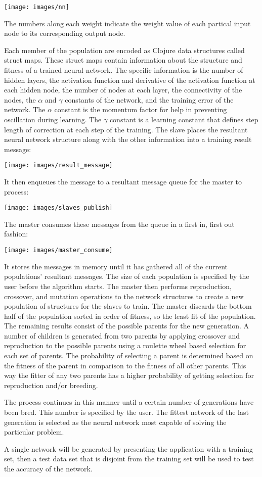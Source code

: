 \texttt{[image: images/nn]}

The numbers along each weight indicate the weight value of each partical input node to its corresponding output node. 

Each member of the population are encoded as Clojure data structures called struct maps. 
These struct maps contain information about the structure and fitness of a trained neural network. 
The specific information is the number of hidden layers, the activation function and derivative of the activation function at each hidden node, the number of nodes at each layer, the connectivity of the nodes, the $\alpha$ and $\gamma$ constants of the network, and the training error of the network. 
The $\alpha$ constant is the momentum factor for help in preventing oscillation during learning. 
The $\gamma$ constant is a learning constant that defines step length of correction at each step of the training.
The slave places the resultant neural network structure along with the other information into a training result message:

\texttt{[image: images/result\_message]}

It then enqueues the message to a resultant message queue for the master to process:

\texttt{[image: images/slaves\_publish]} 

The master consumes these messages from the queue in a first in, first out fashion:

\texttt{[image: images/master\_consume]} 

It stores the messages in memory until it has gathered all of the current populations' resultant messages. 
The size of each population is specified by the user before the algorithm starts.
The master then performs reproduction, crossover, and mutation operations to the network structures to create a new population of structures for the slaves to train.
The master discards the bottom half of the population sorted in order of fitness, so the least fit of the population. 
The remaining results consist of the possible parents for the new generation. 
A number of children is generated from two parents by applying crossover and reproduction to the possible parents using a roulette wheel based selection for each set of parents. 
The probability of selecting a parent is determined based on the fitness of the parent in comparison to the fitness of all other parents. 
This way the fitter of any two parents has a higher probability of getting selection for reproduction and/or breeding.

The process continues in this manner until a certain number of generations have been bred. 
This number is specified by the user. 
The fittest network of the last generation is selected as the neural network most capable of solving the particular problem.  

A single network will be generated by presenting the application with a training set, then a test data set that is disjoint from the training set will be used to test the accuracy of the network.
